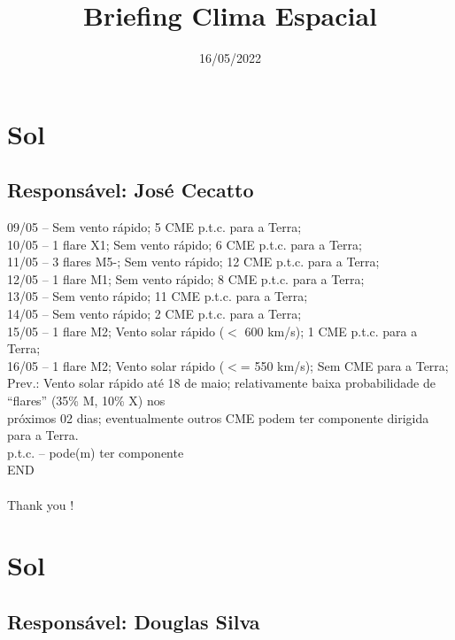\documentclass[a4paper, 10pt]{article}
\title{\Large{\textbf{Briefing Clima Espacial}}}
\date{16/05/2022}
\begin{document}
\maketitle 

  \thispagestyle{fancy} \section{Sol} 
 \subsection{Responsável: José Cecatto}

09/05 – Sem vento rápido; 5 CME p.t.c. para a Terra; \\ 10/05 – 1 flare X1; Sem vento rápido; 6 CME p.t.c. para a Terra; \\ 11/05 – 3 flares M5-; Sem vento rápido; 12 CME p.t.c. para a Terra;  \\ 12/05 – 1 flare M1; Sem vento rápido; 8 CME p.t.c. para a Terra;  \\ 13/05 – Sem vento rápido; 11 CME p.t.c. para a Terra; \\ 14/05 – Sem vento rápido; 2 CME p.t.c. para a Terra; \\ 15/05 – 1 flare M2; Vento solar rápido ($<$ 600 km/s); 1 CME p.t.c. para a Terra; \\ 16/05 – 1 flare M2; Vento solar rápido ($<$= 550 km/s); Sem CME para a Terra; \\ Prev.: Vento solar rápido até 18 de maio; relativamente baixa probabilidade de “flares” (35\% M, 10\% X) nos \\ próximos 02 dias; eventualmente outros CME podem ter componente dirigida para a Terra. \\ p.t.c. – pode(m) ter componente \\ END \\  \\ Thank you !\section{Sol} 
 \subsection{Responsável: Douglas Silva}
\end{document}
